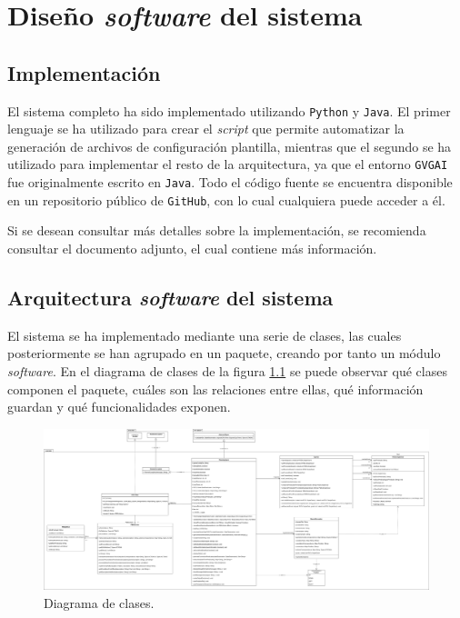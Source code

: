 
\chapter{Diseño \textit{software} del sistema}

\section{Implementación}

El sistema completo ha sido implementado utilizando \texttt{Python} y \texttt{Java}.
El primer lenguaje se ha utilizado para crear el \textit{script} que permite
automatizar la generación de archivos de configuración plantilla, mientras que el segundo
se ha utilizado para implementar el resto de la arquitectura, ya que el entorno
\texttt{GVGAI} fue originalmente escrito en \texttt{Java}. Todo el código fuente
se encuentra disponible en un repositorio público de \texttt{GitHub}, con lo cual
cualquiera puede acceder a él.

Si se desean consultar más detalles sobre la implementación, se recomienda consultar
el documento adjunto, el cual contiene más información.

\section{Arquitectura \textit{software} del sistema}

El sistema se ha implementado mediante una serie de clases, las cuales posteriormente
se han agrupado en un paquete, creando por tanto un módulo \textit{software}. En el diagrama
de clases de la figura \ref{fig:class_diagram} se puede observar qué clases componen
el paquete, cuáles son las relaciones entre ellas, qué información guardan y
qué funcionalidades exponen.

\begin{figure}[H]
    \centering
    \includegraphics[angle=90, origin=c, scale=0.18]{img/CH07/class_diagram.png}
    \caption{Diagrama de clases.}
    \label{fig:class_diagram}
\end{figure}

